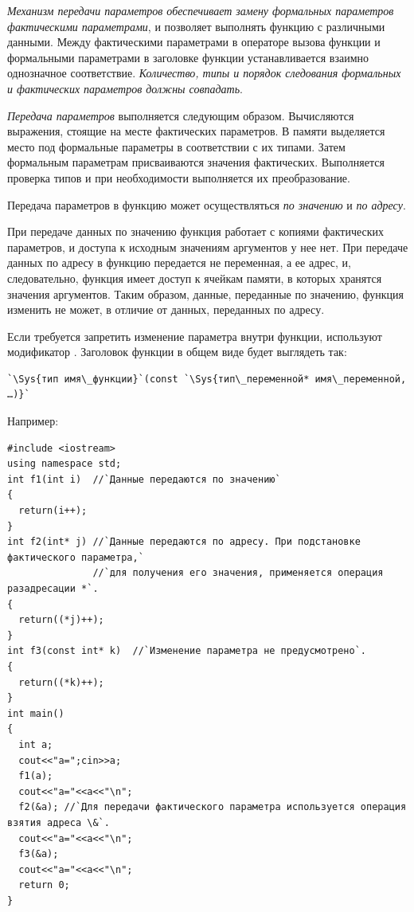 \emph{Механизм передачи параметров обеспечивает замену формальных параметров фактическими параметрами}, и
позволяет выполнять функцию с различными данными. Между фактическими параметрами в операторе вызова функции и
формальными параметрами в заголовке функции устанавливается взаимно однозначное соответствие.
\emph{Количество, типы и порядок следования формальных и фактических параметров должны совпадать}.

\emph{Передача параметров} выполняется следующим образом. Вычисляются выражения,
стоящие на месте фактических параметров. В памяти выделяется место под формальные параметры в соответствии с их
типами. Затем формальным параметрам присваиваются значения фактических. Выполняется проверка типов и при необходимости
выполняется их преобразование. %

Передача параметров в функцию может осуществляться \emph{по
значению} и \emph{по адресу}. 

При передаче данных по значению функция работает с копиями фактических параметров, и доступа к исходным значениям
аргументов у нее нет. При передаче данных по адресу в функцию передается не переменная, а ее адрес, и, следовательно,
функция имеет доступ к ячейкам памяти, в которых хранятся значения аргументов. Таким образом, данные, переданные по
значению, функция изменить не может, в отличие от данных, переданных по адресу. 

Если требуется запретить изменение параметра внутри функции, используют модификатор . Заголовок
функции в общем виде будет выглядеть так:
\begin{lstlisting}
`\Sys{тип имя\_функции}`(const `\Sys{тип\_переменной* имя\_переменной, …)}`
\end{lstlisting}

Например:
\begin{lstlisting}
#include <iostream>
using namespace std;
int f1(int i)  //`Данные передаются по значению`
{
  return(i++);
}
int f2(int* j) //`Данные передаются по адресу. При подстановке фактического параметра,` 
               //`для получения его значения, применяется операция разадресации *`.
{
  return((*j)++);
}
int f3(const int* k)  //`Изменение параметра не предусмотрено`.
{
  return((*k)++);
}
int main()
{
  int a;
  cout<<"a=";cin>>a;
  f1(a);
  cout<<"a="<<a<<"\n";
  f2(&a); //`Для передачи фактического параметра используется операция взятия адреса \&`.
  cout<<"a="<<a<<"\n";
  f3(&a);
  cout<<"a="<<a<<"\n";
  return 0;
}
\end{lstlisting}

